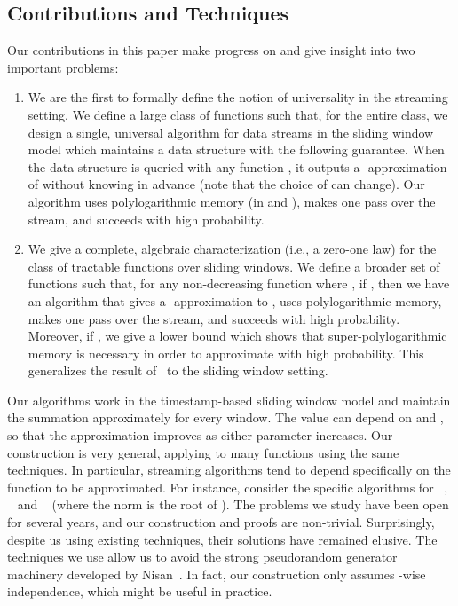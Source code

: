 \documentclass[11pt]{article}
\begin{document}
\subsection{Contributions and Techniques}
Our contributions in this paper make progress on and give insight into two important problems:
\begin{enumerate}[itemsep=0mm]
\item We are the first to formally define the notion of universality in the streaming setting.  We define
a large class of functions  such that, for the entire class, we design a single, universal algorithm
for data streams in the sliding window model which maintains a data structure with the following guarantee.
When the data structure is queried with any function , it outputs a
-approximation of  without knowing  in advance (note
that the choice of  can change).  Our algorithm uses polylogarithmic memory (in  and ), makes one
pass over the stream, and succeeds with high probability.

\item We give a complete, algebraic characterization (i.e., a zero-one law) for the class of tractable functions over
sliding windows.  We define a broader set of functions 
such that, for any non-decreasing function  where , if , then we have an algorithm that gives
a -approximation to , uses polylogarithmic memory, makes one pass
over the stream, and succeeds with high probability.  Moreover, if ,
we give a lower bound which shows that super-polylogarithmic memory is necessary in order to approximate
 with high probability.  This generalizes the result of~\cite{BO10}
to the sliding window setting.
\end{enumerate}

Our algorithms work in the timestamp-based sliding window model and maintain the summation approximately for every window.
The value  can depend on  and , so that
the approximation improves as either parameter increases. Our construction
is very general, applying to many functions using the same techniques.
In particular, streaming algorithms tend to depend specifically on the function
to be approximated.  For instance, consider the specific algorithms for ~\cite{AMS96, I06},
~\cite{FM85, CDIM03, AMS96} and ~\cite{I06, L09, KNW10Soda} (where the 
norm is the  root of ).  The problems we study have been open
for several years, and our construction and proofs are
non-trivial.  Surprisingly, despite us using existing techniques, their solutions have remained
elusive.  The techniques we use allow us to avoid the strong pseudorandom
generator machinery developed by Nisan~\cite{N90}.  In fact, our construction only assumes
-wise independence, which might be useful in practice.
\end{document}
